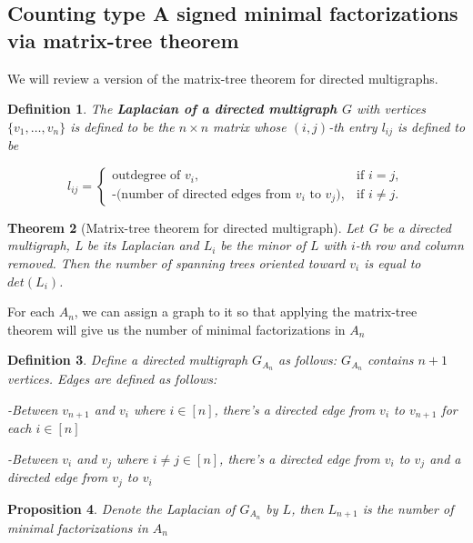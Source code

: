 \documentclass[11pt]{amsart}
\newtheorem{thm}{Theorem}[section]
\newtheorem{defi}[thm]{Definition}%
\newtheorem{prop}[thm]{Proposition}%
\begin{document}
\subsection{Counting type A signed minimal factorizations via matrix-tree theorem}

We will review a version of the matrix-tree theorem for directed multigraphs.

\begin{defi}
    The \textbf{Laplacian of a directed multigraph $G$} with vertices $\{v_1,\dots,v_n\}$ is defined to be the $n \times n$ matrix whose $(i,j)$-th entry $l_{ij}$ is defined to be 

    \begin{equation}
    l_{ij}=\begin{cases}
    \text{outdegree of $v_i$}, & \text{if $i=j$},\\
    \text{-(number of directed edges from $v_i$ to $v_j$)}, & \text{if $i \neq j$}.
    \end{cases}
    \end{equation}
\end{defi}

\begin{thm}[Matrix-tree theorem for directed multigraph]
    Let G be a directed multigraph, L be its Laplacian and $L_i$ be the minor of $L$ with $i$-th row and column removed. Then the number of spanning trees oriented toward $v_i$ is equal to $det(L_i)$.
\end{thm}

For each $A_n$, we can assign a graph to it so that applying the matrix-tree theorem will give us the number of minimal factorizations in $A_n$

\begin{defi}
Define a directed multigraph $G_{A_n}$ as follows: 
$G_{A_n}$ contains $n+1$ vertices. Edges are defined as follows:

-Between $v_{n+1}$ and $v_i$ where $i \in [n]$, there's a directed edge from $v_i$ to $v_{n+1}$ for each $i \in [n]$

-Between $v_{i}$ and $v_j$ where $i\neq j \in [n]$, there's a directed edge from $v_i$ to $v_j$ and a directed edge from $v_j$ to $v_i$
\end{defi}

\begin{prop}
    Denote the Laplacian of $G_{A_n}$ by $L$, then $L_{n+1}$ is the number of minimal factorizations in $A_n$
\end{prop}
\end{document}
